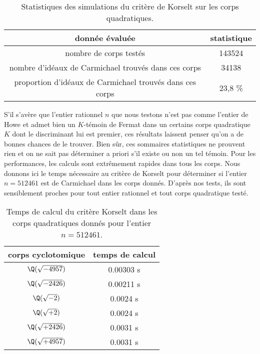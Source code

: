 \begin{table}[H]\label{statistiques-quadra}
	\begin{center}
		\begin{tabular}{|c|c|}
			\hline
			donnée évaluée & statistique \\
			\hline
			\hline
			nombre de corps testés & 143524 \\\hline
			nombre d'idéaux de Carmichael trouvés dans ces corps & 34138 \\\hline
			proportion d'idéaux de Carmichael trouvés dans ces corps & 23,8 \% \\\hline
		\end{tabular}
		\caption{Statistiques des simulations du critère de Korselt sur les corps quadratiques.}
	\end{center}
\end{table}

S'il s'avère que l'entier rationnel $n$ que nous testons n'est pas comme l'entier de Howe et admet bien un $K$-témoin de Fermat dans un certains corps quadratique $K$ dont le discriminant lui est premier, ces résultats laissent penser qu'on a de bonnes chances de le trouver. Bien sûr, ces sommaires statistiques ne prouvent rien et on ne sait pas déterminer a priori s'il existe ou non un tel témoin. Pour les performances, les calculs sont extrêmement rapides dans tous les corps. Nous donnons ici le temps nécessaire au critère de Korselt pour déterminer si l'entier $n = 512461$ est de Carmichael dans les corps donnés. D'après nos tests, ils sont sensiblement proches pour tout entier rationnel et tout corps quadratique testé.

\begin{table}[H]
	\begin{center}
		\begin{tabular}{|c|c|}
			\hline
			corps cyclotomique & temps de calcul \\
			\hline
			\hline
			$\Q(\sqrt{-4957})$ & 0.00303 s \\\hline
			$\Q(\sqrt{-2426})$ & 0.00211 s \\\hline
			$\Q(\sqrt{-2})$ & 0.0024 s \\\hline
			$\Q(\sqrt{+2})$ & 0.0024 s \\\hline
			$\Q(\sqrt{+2426})$ & 0.0031 s \\\hline
			$\Q(\sqrt{+4957})$ & 0.0031 s \\\hline
		\end{tabular}
		\caption{Temps de calcul du critère Korselt dans les corps quadratiques donnés pour l'entier $n=512461$.}
	\end{center}
\end{table}
